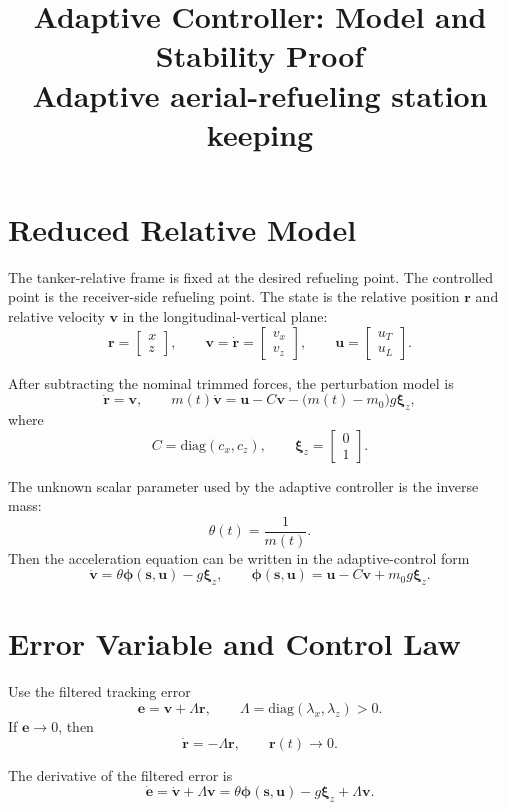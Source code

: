 \documentclass[11pt,a4paper]{article}
\title{\textbf{Adaptive Controller: Model and Stability Proof}\\
\large Adaptive aerial-refueling station keeping}
\author{}
\date{}
\begin{document}
\maketitle

\section{Reduced Relative Model}

The tanker-relative frame is fixed at the desired refueling point. The
controlled point is the receiver-side refueling point. The state is the
relative position $\bm r$ and relative velocity $\bm v$ in the
longitudinal-vertical plane:
\[
\bm r =
\begin{bmatrix}
x \\ z
\end{bmatrix},
\qquad
\bm v = \dot{\bm r} =
\begin{bmatrix}
v_x \\ v_z
\end{bmatrix},
\qquad
\bm u =
\begin{bmatrix}
u_T \\ u_L
\end{bmatrix}.
\]

After subtracting the nominal trimmed forces, the perturbation model is
\[
\dot{\bm r}=\bm v,
\qquad
m(t)\dot{\bm v}
=
\bm u-C\bm v-\bigl(m(t)-m_0\bigr)g\bm \xi_z,
\]
where
\[
C=\mathrm{diag}(c_x,c_z),
\qquad
\bm \xi_z=
\begin{bmatrix}
0 \\ 1
\end{bmatrix}.
\]

The unknown scalar parameter used by the adaptive controller is the inverse
mass:
\[
\theta(t)=\frac{1}{m(t)}.
\]
Then the acceleration equation can be written in the adaptive-control form
\[
\dot{\bm v}
=
\theta\bm\phi(\bm s,\bm u)-g\bm\xi_z,
\qquad
\bm\phi(\bm s,\bm u)
=
\bm u-C\bm v+m_0g\bm\xi_z.
\]

\section{Error Variable and Control Law}

Use the filtered tracking error
\[
\bm e=\bm v+\Lambda\bm r,
\qquad
\Lambda=\mathrm{diag}(\lambda_x,\lambda_z)>0.
\]
If $\bm e\to0$, then
\[
\dot{\bm r}=-\Lambda\bm r,
\qquad
\bm r(t)\to0.
\]

The derivative of the filtered error is
\[
\dot{\bm e}
=
\dot{\bm v}+\Lambda\bm v
=
\theta\bm\phi(\bm s,\bm u)-g\bm\xi_z+\Lambda\bm v.
\]
\end{document}
